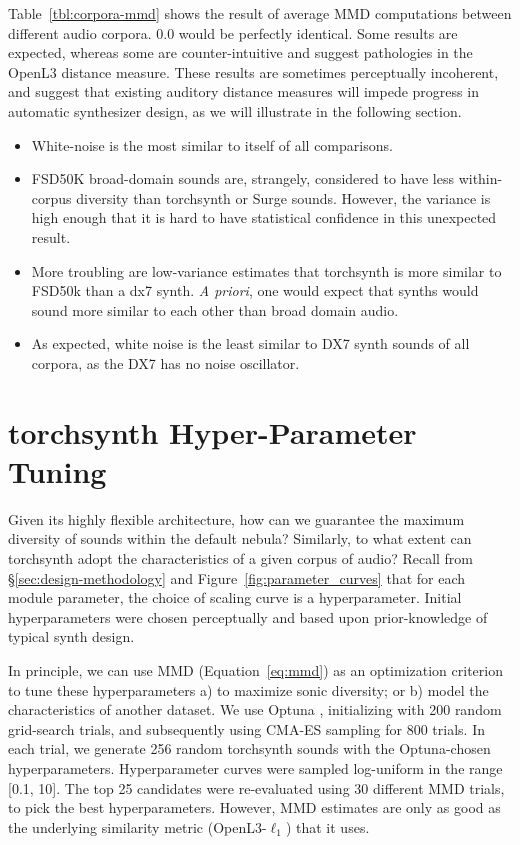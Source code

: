 Table~\ref{tbl:corpora-mmd} shows the result of average MMD computations between different audio corpora. 0.0 would be perfectly identical. Some results are expected, whereas some are counter-intuitive and suggest pathologies in the OpenL3 distance measure. These results are sometimes perceptually incoherent, and suggest that existing auditory distance measures will impede progress in automatic synthesizer design, as we will illustrate in the following section.


\begin{itemize}
    \item White-noise is the most similar to itself of all comparisons.
    \item FSD50K broad-domain sounds are, strangely, considered to have less within-corpus diversity than torchsynth or Surge sounds. However, the variance is high enough that it is hard to have statistical confidence in this unexpected result.
    \item More troubling are low-variance estimates that torchsynth is more similar to FSD50k than a dx7 synth. {\em A priori}, one would expect that synths would sound more similar to each other than broad domain audio. %
    \item As expected, white noise is the least similar to DX7 synth sounds of all corpora, as the DX7 has no noise oscillator.
\end{itemize}



\section{torchsynth Hyper-Parameter Tuning}
\label{sec:hyperparameter-tuning}

Given its highly flexible architecture, how can we guarantee the maximum diversity of sounds within the default nebula? Similarly, to what extent can torchsynth adopt the characteristics of a given corpus of audio? Recall from \S\ref{sec:design-methodology} and Figure~\ref{fig:parameter_curves} that for each module parameter, the choice of scaling curve is a hyperparameter. Initial hyperparameters were chosen perceptually and based upon prior-knowledge of typical synth design.

In principle, we can use MMD (Equation~\ref{eq:mmd}) as an optimization criterion to tune these hyperparameters a) to maximize sonic diversity; or b) model the characteristics of another dataset. We use Optuna \cite{optuna_2019}, initializing with 200 random grid-search trials, and subsequently using CMA-ES sampling for 800 trials. In each trial, we generate 256 random torchsynth sounds with the Optuna-chosen hyperparameters. %
Hyperparameter curves were sampled log-uniform in the range [0.1, 10]. The top 25 candidates were re-evaluated using 30 different MMD trials, to pick the best hyperparameters. However, MMD estimates are only as good as the underlying similarity metric (OpenL3-$\ell_1$) that it uses.

